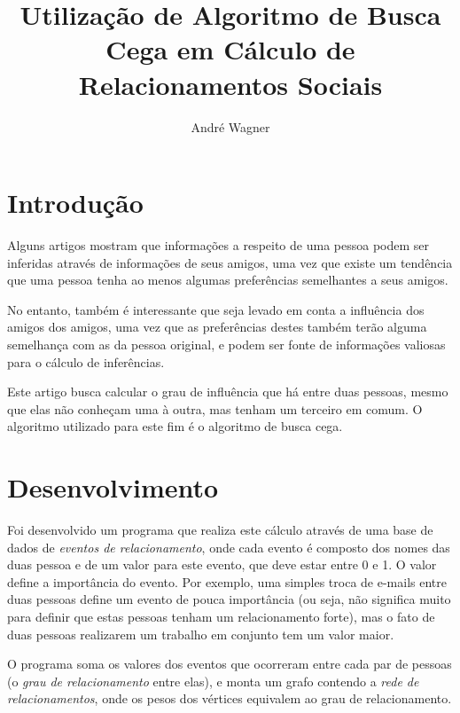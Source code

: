 \documentclass[a4paper, twocolumn, 12pt]{article}
\author{André Wagner}
\title{Utilização de Algoritmo de Busca Cega em Cálculo de Relacionamentos Sociais}
\begin{document}
\maketitle


\section{Introdução}

Alguns artigos \cite{?} mostram que informações a respeito de uma pessoa podem ser inferidas através de informações de seus amigos, uma vez que existe um tendência que uma pessoa tenha ao menos algumas preferências semelhantes a seus amigos.

No entanto, também é interessante que seja levado em conta a influência dos amigos dos amigos, uma vez que as preferências destes também terão alguma semelhança com as da pessoa original,  e podem ser fonte de informações valiosas para o cálculo de inferências.

Este artigo busca calcular o grau de influência que há entre duas pessoas, mesmo que elas não conheçam uma à outra, mas tenham um terceiro em comum. O algoritmo utilizado para este fim é o algoritmo de busca cega. \cite{?}


\section{Desenvolvimento}

Foi desenvolvido um programa que realiza este cálculo através de uma base de dados de \emph{eventos de relacionamento}, onde cada evento é composto dos nomes das duas pessoa e de um valor para este evento, que deve estar entre 0 e 1. O valor define a importância do evento. Por exemplo, uma simples troca de e-mails entre duas pessoas define um evento de pouca importância (ou seja, não significa muito para definir que estas pessoas tenham um relacionamento forte), mas o fato de duas pessoas realizarem um trabalho em conjunto tem um valor maior.

O programa soma os valores dos eventos que ocorreram entre cada par de pessoas (o \emph{grau de relacionamento} entre elas), e monta um grafo contendo a \emph{rede de relacionamentos}, onde os pesos dos vértices equivalem ao grau de relacionamento.
\end{document}
